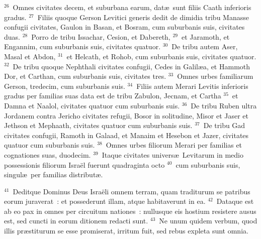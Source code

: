 ${}^{26}$~Omnes civitates decem, et suburbana earum, dat\ae\ sunt filiis Caath inferioris gradus.
${}^{27}$~Filiis quoque Gerson Levitici generis dedit de dimidia tribu Manasse confugii civitates, Gaulon in Basan, et Bosram, cum suburbanis suis, civitates duas.
${}^{28}$~Porro de tribu Issachar, Cesion, et Dabereth,
${}^{29}$~et Jaramoth, et Engannim, cum suburbanis suis, civitates quatuor.
${}^{30}$~De tribu autem Aser, Masal et Abdon,
${}^{31}$~et Helcath, et Rohob, cum suburbanis suis, civitates quatuor.
${}^{32}$~De tribu quoque Nephthali civitates confugii, Cedes in Galil\ae a, et Hammoth Dor, et Carthan, cum suburbanis suis, civitates tres.
${}^{33}$~Omnes urbes familiarum Gerson, tredecim, cum suburbanis suis.
${}^{34}$~Filiis autem Merari Levitis inferioris gradus per familias suas data est de tribu Zabulon, Jecnam, et Cartha
${}^{35}$~et Damna et Naalol, civitates quatuor cum suburbanis suis.
${}^{36}$~De tribu Ruben ultra Jordanem contra Jericho civitates refugii, Bosor in solitudine, Misor et Jaser et Jethson et Mephaath, civitates quatuor cum suburbanis suis.
${}^{37}$~De tribu Gad civitates confugii, Ramoth in Galaad, et Manaim et Hesebon et Jazer, civitates quatuor cum suburbanis suis.
${}^{38}$~Omnes urbes filiorum Merari per familias et cognationes suas, duodecim.
${}^{39}$~Itaque civitates univers\ae\ Levitarum in medio possessionis filiorum Isra\"el fuerunt quadraginta octo
${}^{40}$~cum suburbanis suis, singul\ae\ per familias distribut\ae .


${}^{41}$~Deditque Dominus Deus Isra\"eli omnem terram, quam traditurum se patribus eorum juraverat~: et possederunt illam, atque habitaverunt in ea.
${}^{42}$~Dataque est ab eo pax in omnes per circuitum nationes~: nullusque eis hostium resistere ausus est, sed cuncti in eorum ditionem redacti sunt.
${}^{43}$~Ne unum quidem verbum, quod illis pr\ae stiturum se esse promiserat, irritum fuit, sed rebus expleta sunt omnia.


